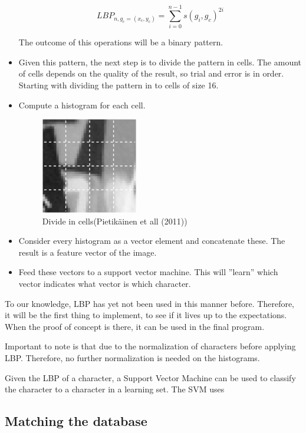 \documentclass[a4paper]{article}
\begin{document}
\begin{itemize}
$$LBP_{n, g_c = (x_c, y_c)} = \sum\limits_{i=0}^{n-1} s(g_i, g_c)^{2i} $$

The outcome of this operations will be a binary pattern.

\item Given this pattern, the next step is to divide the pattern in cells. The
amount of cells depends on the quality of the result, so trial and error is in
order. Starting with dividing the pattern in to cells of size 16. 

\item Compute a histogram for each cell.

\begin{figure}[h!]
\center
\includegraphics[scale=0.7]{cells.png}
\caption{Divide in cells(Pietik\"ainen et all (2011))}
\end{figure}

\item Consider every histogram as a vector element and concatenate these. The
result is a feature vector of the image.

\item Feed these vectors to a support vector machine. This will ''learn'' which
vector indicates what vector is which character. 

\end{itemize}

To our knowledge, LBP has yet not been used in this manner before. Therefore,
it will be the first thing to implement, to see if it lives up to the
expectations. When the proof of concept is there, it can be used in the final
program.

Important to note is that due to the normalization of characters before
applying LBP. Therefore, no further normalization is needed on the histograms.

Given the LBP of a character, a Support Vector Machine can be used to classify
the character to a character in a learning set. The SVM uses

\subsection{Matching the database}
\end{document}

